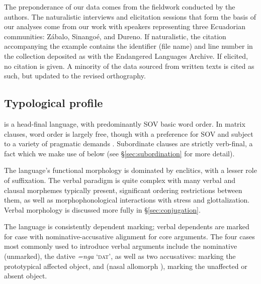 \documentclass[output=paper,colorlinks,citecolor=brown]{langscibook}
\begin{document}
The preponderance of our data comes from the fieldwork conducted by the authors. The naturalistic interviews and elicitation sessions that form the basis of our analyses come from our work with speakers representing three Ecuadorian communities: Zábalo, Sinango\'e, and Du\-re\-no. If naturalistic, the citation accompanying the example contains the identifier (file name) and line number in the collection deposited as \citet{anderboissilva2018collection} with the Endangered Languages Archive. If elicited, no citation is given. A minority of the data sourced from written texts is cited as such, but updated to the revised orthography.




\subsection{Typological profile} \label{sec:typology}

 is a head-final language, with predominantly SOV basic word order. In matrix clauses, word order is largely free, though with a preference for SOV and subject to a variety of pragmatic demands \citep{fischerhengeveld}. Subordinate clauses are strictly verb-final, a fact which we make use of below (see \S\ref{sec:subordination} for more detail). 

The language's functional morphology is dominated by enclitics, with a lesser role of suffixation. The verbal paradigm is quite complex with many verbal and clausal morphemes typically present, significant ordering restrictions between them, as well as morphophonological interactions with stress and glottalization.
Verbal morphology is discussed more fully in \S\ref{sec:conjugation}.

The language is consistently dependent marking; verbal dependents are mark\-ed for case with nominative-accusative alignment for core arguments. The four cases most commonly used to introduce verbal arguments include the nominative (unmarked), the dative \emph{=nga} `\textsc{dat}', as well as two accusatives:  marking the prototypical affected object, and  (nasal allomorph ), marking the unaffected or absent object.
\end{document}
